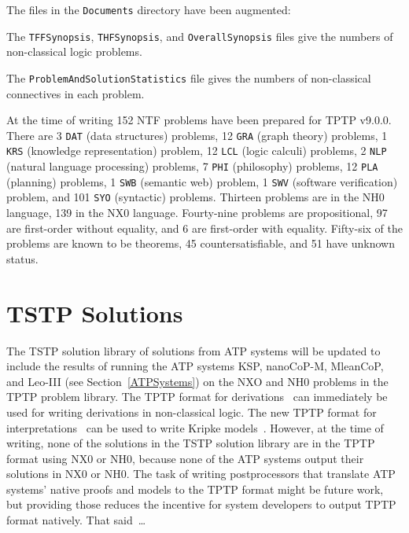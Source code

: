 \documentclass{ceurart}
\newenvironment{packed_itemize}{
\vspace*{-0.5em}
\begin{itemize}
\setlength{\partopsep}{0pt}
\setlength{\itemsep}{1pt}
\setlength{\parskip}{0pt}
\setlength{\parsep}{0pt}
}{\end{itemize}}
\begin{document}
The files in the {\tt Documents} directory have been augmented:
\begin{packed_itemize}
\item The {\tt TFFSynopsis}, {\tt THFSynopsis}, and {\tt OverallSynopsis} files give the numbers 
      of non-classical logic problems.
\item The {\tt ProblemAndSolutionStatistics} file gives the numbers of non-classical
      connectives in each problem.
\end{packed_itemize}

At the time of writing 152 NTF problems have been prepared for TPTP v9.0.0.
There are 3 {\tt DAT} (data structures) problems, 12 {\tt GRA} (graph theory) problems, 
1 {\tt KRS} (knowledge representation) problem, 12 {\tt LCL} (logic calculi) problems, 
2 {\tt NLP} (natural language processing) problems, 7 {\tt PHI} (philosophy) problems,
12 {\tt PLA} (planning) problems, 1 {\tt SWB} (semantic web) problem, 1 {\tt SWV} (software 
verification) problem, and 101 {\tt SYO} (syntactic) problems.
Thirteen problems are in the NH0 language, 139 in the NX0 language.
Fourty-nine problems are propositional, 97 are first-order without equality, and 6 are
first-order with equality.
Fifty-six of the problems are known to be theorems, 45 countersatisfiable, and 51 have unknown
status.

\section{TSTP Solutions}
\label{TSTP}

The TSTP solution library of solutions from ATP systems will be updated to include the results 
of running the ATP systems KSP, nanoCoP-M, MleanCoP, and Leo-III (see Section~\ref{ATPSystems}) 
on the NXO and NH0 problems in the TPTP problem library.
The TPTP format for derivations~\cite{SS+06} can immediately be used for writing derivations in
non-classical logic.
The new TPTP format for interpretations~\cite{SS+23-LPAR} can be used to write Kripke 
models~\cite{Kri63}.
However, at the time of writing, none of the solutions in the TSTP solution library are in the 
TPTP format using NX0 or NH0, because none of the ATP systems output their solutions in NX0 or NH0.
The task of writing postprocessors that translate ATP systems' native proofs and models to the
TPTP format might be future work, but providing those reduces the incentive for system developers
to output TPTP format natively.
That said~\ldots
\end{document}
